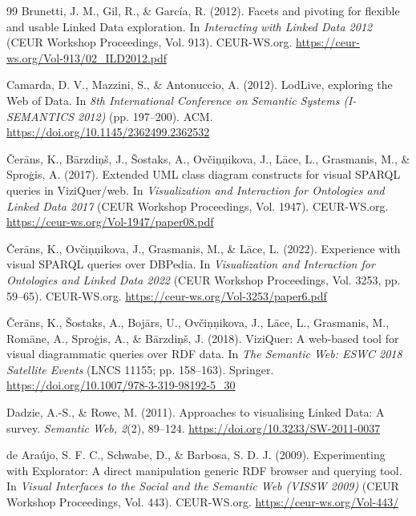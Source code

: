 \documentclass[manuscript,review,screen]{acmart}
\begin{document}
\begin{thebibliography}{99}
 Brunetti, J. M., Gil, R., \& Garc\'{i}a, R. (2012). Facets and pivoting for flexible and usable Linked Data exploration. In \textit{Interacting with Linked Data 2012} (CEUR Workshop Proceedings, Vol. 913). CEUR-WS.org. \url{https://ceur-ws.org/Vol-913/02_ILD2012.pdf}

 Camarda, D. V., Mazzini, S., \& Antonuccio, A. (2012). LodLive, exploring the Web of Data. In \textit{8th International Conference on Semantic Systems (I-SEMANTICS 2012)} (pp. 197--200). ACM. \url{https://doi.org/10.1145/2362499.2362532}

 \v{C}er\={a}ns, K., B\={a}rzdi\c{n}\v{s}, J., \v{S}ostaks, A., Ov\v{c}i\c{n}\c{n}ikova, J., L\={a}ce, L., Grasmanis, M., \& Spro\c{g}is, A. (2017). Extended UML class diagram constructs for visual SPARQL queries in ViziQuer/web. In \textit{Visualization and Interaction for Ontologies and Linked Data 2017} (CEUR Workshop Proceedings, Vol. 1947). CEUR-WS.org. \url{https://ceur-ws.org/Vol-1947/paper08.pdf}

 \v{C}er\={a}ns, K., Ov\v{c}i\c{n}\c{n}ikova, J., Grasmanis, M., \& L\={a}ce, L. (2022). Experience with visual SPARQL queries over DBPedia. In \textit{Visualization and Interaction for Ontologies and Linked Data 2022} (CEUR Workshop Proceedings, Vol. 3253, pp. 59--65). CEUR-WS.org. \url{https://ceur-ws.org/Vol-3253/paper6.pdf}

 \v{C}er\={a}ns, K., \v{S}ostaks, A., Boj\={a}rs, U., Ov\v{c}i\c{n}\c{n}ikova, J., L\={a}ce, L., Grasmanis, M., Rom\={a}ne, A., Spro\c{g}is, A., \& B\={a}rzdi\c{n}\v{s}, J. (2018). ViziQuer: A web-based tool for visual diagrammatic queries over RDF data. In \textit{The Semantic Web: ESWC 2018 Satellite Events} (LNCS 11155; pp. 158--163). Springer. \url{https://doi.org/10.1007/978-3-319-98192-5_30}

 Dadzie, A.-S., \& Rowe, M. (2011). Approaches to visualising Linked Data: A survey. \textit{Semantic Web, 2}(2), 89--124. \url{https://doi.org/10.3233/SW-2011-0037}

 de Ara\'{u}jo, S. F. C., Schwabe, D., \& Barbosa, S. D. J. (2009). Experimenting with Explorator: A direct manipulation generic RDF browser and querying tool. In \textit{Visual Interfaces to the Social and the Semantic Web (VISSW 2009)} (CEUR Workshop Proceedings, Vol. 443). CEUR-WS.org. \url{https://ceur-ws.org/Vol-443/}


\end{thebibliography}
\end{document}
